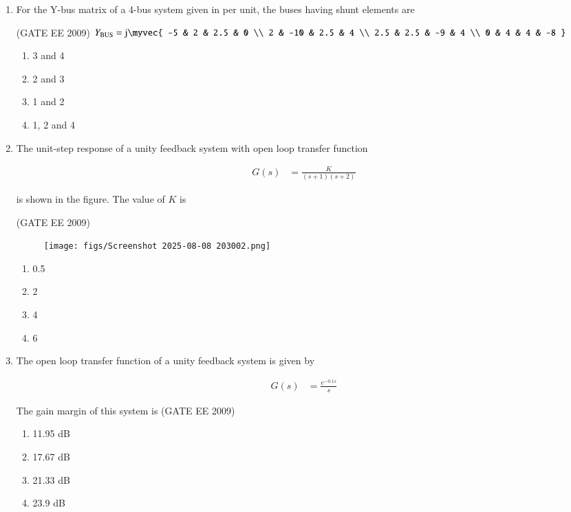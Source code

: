 \documentclass[journal,12pt,onecolumn]{IEEEtran}
\theoremstyle{remark}
\begin{document}
\begin{flushleft}
\begin{enumerate}
\item For the Y-bus matrix of a 4-bus system given in per unit, the buses having shunt elements are

\hfill(GATE EE 2009)
$Y_{\text{BUS}} = \mathrm{j}\myvec{
-5 & 2 & 2.5 & 0 \\
2 & -10 & 2.5 & 4 \\
2.5 & 2.5 & -9 & 4 \\
0 & 4 & 4 & -8
}$


\begin{enumerate}
    \item 3 and 4
    \item 2 and 3
    \item 1 and 2
    \item 1, 2 and 4
\end{enumerate}

\item The unit-step response of a unity feedback system with open loop transfer function 

\begin{align*}
G(s)&= \frac{K}{(s+1)(s+2)}
\end{align*}

is shown in the figure. The value of $K$ is

\hfill(GATE EE 2009)
\begin{figure}[h!]
    \centering
    \texttt{[image: figs/Screenshot 2025-08-08 203002.png]}
    \caption{}
    \label{fig:placeholder}
\end{figure}

\begin{enumerate}
    \item 0.5
    \item 2
    \item 4
    \item 6
\end{enumerate}


\item The open loop transfer function of a unity feedback system is given by

\begin{align*}
G(s)&= \frac{e^{-0.1s}}{s} 
\end{align*}

The gain margin of this system is
\hfill(GATE EE 2009)
\begin{enumerate}
    \item 11.95 dB
    \item 17.67 dB
    \item 21.33 dB
    \item 23.9 dB
\end{enumerate}


\end{enumerate}
\end{flushleft}
\end{document}

